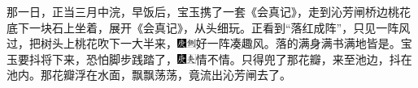 那一日，正当三月中浣，早饭后，宝玉携了一套《会真记》，走到沁芳闸桥边桃花底下一块石上坐着，展开《会真记》，从头细玩。正看到``落红成阵''，只见一阵风过，把树头上桃花吹下一大半来，{\includegraphics[width=3mm]{../Images/00004}\includegraphics[width=3mm]{../Images/00011}\footnotesize \kaishu 好一阵凑趣风。}落的满身满书满地皆是。宝玉要抖将下来，恐怕脚步践踏了，{\includegraphics[width=3mm]{../Images/00004}\includegraphics[width=3mm]{../Images/00012}\footnotesize \kaishu 情不情。}只得兜了那花瓣，来至池边，抖在池内。那花瓣浮在水面，飘飘荡荡，竟流出沁芳闸去了。

